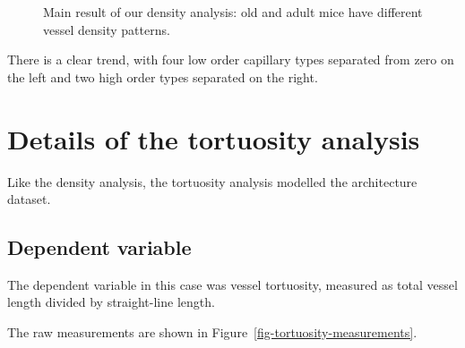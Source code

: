 \documentclass[
  letterpaper,
  DIV=11,
  numbers=noendperiod,
  oneside]{scrartcl}
\theoremstyle{plain}
\theoremstyle{remark}
\begin{document}
\begin{figure}


\caption{\label{fig-density-effects-detail}Main result of our density
analysis: old and adult mice have different vessel density patterns.}

\end{figure}%

There is a clear trend, with four low order capillary types separated
from zero on the left and two high order types separated on the right.

\section{Details of the tortuosity
analysis}\label{sec-tortuosity-details}

Like the density analysis, the tortuosity analysis modelled the
architecture dataset.

\subsection{Dependent variable}\label{dependent-variable-5}

The dependent variable in this case was vessel tortuosity, measured as
total vessel length divided by straight-line length.

The raw measurements are shown in
Figure~\ref{fig-tortuosity-measurements}.
\end{document}
